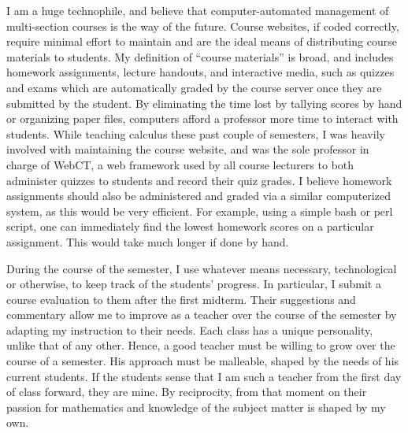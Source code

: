 \documentclass[12pt,oneside]{amsart}
\begin{document}
I am a huge technophile, and believe that computer-automated management of
multi-section courses is the way of the future. Course websites, if coded
correctly, require minimal effort to maintain and are the ideal means of
distributing course materials to students. My definition of ``course materials''
is broad, and includes homework assignments, lecture handouts, and 
interactive media, such as quizzes and exams which are automatically graded by
the course server once they are submitted by the student. By eliminating the
time lost by tallying scores by hand or organizing paper files,
computers afford a professor more time to interact with students. While teaching
calculus these past couple of semesters, I was heavily involved with maintaining the
course website, and was the sole professor in charge of WebCT, a web framework
used by all course lecturers to both administer quizzes to students and 
record their quiz grades. I believe homework assignments should also be
administered and graded via a similar computerized system, as this would be very
efficient. For example, using a simple bash or perl script, one can immediately find the lowest
homework scores on a particular assignment. This would take much longer if done
by hand. 

During the course of the semester, I use whatever means necessary, technological
or otherwise, to keep track of the students' progress. In particular, I submit a
course evaluation to them after the first midterm. Their suggestions and
commentary allow me to improve as a teacher over the course of the semester by
adapting my instruction to their needs. Each class has a unique personality,
unlike that of any other. Hence, a good teacher must be willing to grow over the
course of a semester. His approach must be malleable, shaped by the needs of his
current students.  If the students sense that I am such a teacher from the first
day of class forward, they are mine. By reciprocity, from that moment on their
passion for mathematics and knowledge of the subject matter is shaped by my own. 
\end{document}
